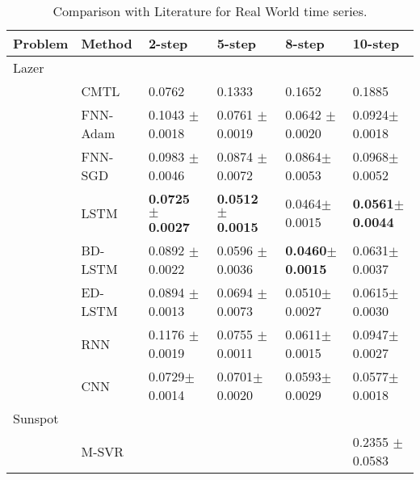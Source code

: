 \documentclass{ieeeaccess}
\begin{document}
\begin{table*}[htbp!]

\centering
 \small
 \caption{Comparison with Literature for Real World time series. }
  


\label{tab:Real}
\begin{tabular}{llllll}

  
 \hline
Problem& Method& 2-step & 5-step &8-step& 10-step\\
 \hline
 \hline


Lazer &    	&   	& \\
 






 
&CMTL \cite{chandra2017CMTLMulti} &  0.0762  &  0.1333  	& 0.1652& 0.1885  \\


&FNN-Adam &  0.1043 $\pm$  0.0018    	& 0.0761 $\pm$  0.0019       &	0.0642	$\pm$ 0.0020       &0.0924$\pm$	0.0018\\

&FNN-SGD  & 0.0983 $\pm$   0.0046     	&   0.0874 $\pm$  0.0072     &	0.0864$\pm$ 	0.0053       &0.0968$\pm$	0.0052\\

&LSTM   &  \textbf{0.0725 $\pm$ 0.0027 }   	&  \textbf{0.0512 $\pm$   0.0015}      &	0.0464$\pm$ 	0.0015       &\textbf{0.0561$\pm$	0.0044}\\

&BD-LSTM   &  0.0892 $\pm$  0.0022     	&   0.0596 $\pm$  0.0036      &\textbf{0.0460$\pm$ 	0.0015}	       &0.0631$\pm$	0.0037\\

&ED-LSTM   &  0.0894 $\pm$  0.0013     	& 0.0694 $\pm$  0.0073       &	0.0510$\pm$ 	0.0027       &0.0615$\pm$	0.0030\\

&RNN  &   0.1176 $\pm$  0.0019    	&  0.0755 $\pm$ 0.0011      &0.0611$\pm$ 	0.0015	       &0.0947$\pm$	0.0027\\

&CNN &  0.0729$\pm$	0.0014    	&  0.0701$\pm$	0.0020      & 0.0593$\pm$	0.0029	       & 0.0577$\pm$	0.0018\\

 \hline
 
 
Sunspot &    	  &	& \\
 

 &M-SVR \cite{zhang2013iterated} &   	&   &	 & 0.2355  $\pm $ 0.0583 \\
 

\end{tabular}
\end{table*}
\end{document}
